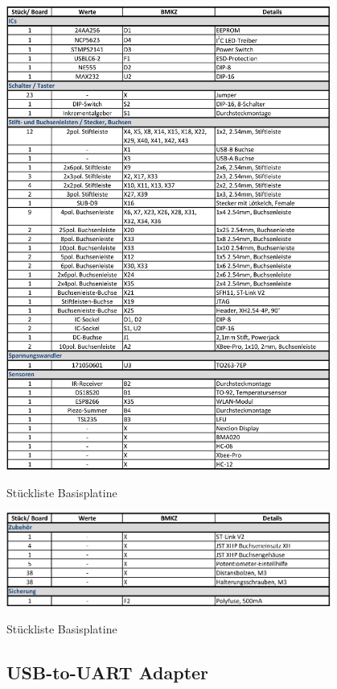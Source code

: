 \begin{table}[H]\ContinuedFloat
    \centering
    \includegraphics[width=0.8\textwidth]{Schuh/Pictures/stuck-basis2}
    \caption[Stückliste Basisplatine]{Stückliste \gls{Basisplatine}}
\end{table}
\begin{table}[H]\ContinuedFloat
    \centering
    \includegraphics[width=0.8\textwidth]{Schuh/Pictures/stuck-basis3}
    \caption[Stückliste Basisplatine]{Stückliste \gls{Basisplatine}}
\end{table}

\subsection{USB-to-UART Adapter}
\label{sec:stücklisten-usbtouart}

